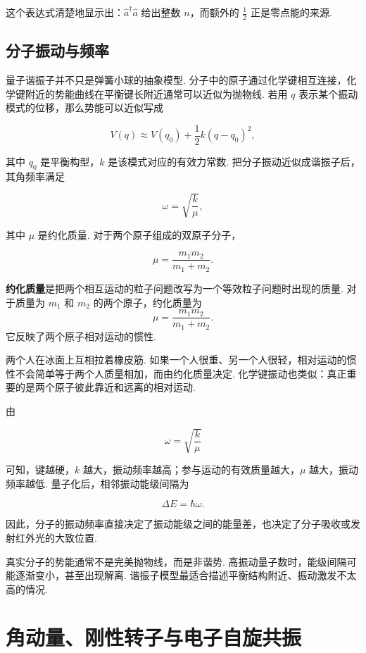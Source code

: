 \documentclass[UTF8,11pt,a4paper,openany]{ctexbook}
\newcommand{\term}[1]{\textbf{#1}}
\begin{document}
这个表达式清楚地显示出：$\hat a^\dagger\hat a$ 给出整数 $n$，而额外的 $\frac12$ 正是零点能的来源. 

\section{分子振动与频率}

量子谐振子并不只是弹簧小球的抽象模型. 分子中的原子通过化学键相互连接，化学键附近的势能曲线在平衡键长附近通常可以近似为抛物线. 若用 $q$ 表示某个振动模式的位移，那么势能可以近似写成

\[
V(q)\approx V(q_0)+\frac12 k(q-q_0)^2,
\]

其中 $q_0$ 是平衡构型，$k$ 是该模式对应的有效力常数. 把分子振动近似成谐振子后，其角频率满足

\[
\omega=\sqrt{\frac{k}{\mu}},
\]

其中 $\mu$ 是约化质量. 对于两个原子组成的双原子分子，

\[
\mu=\frac{m_1m_2}{m_1+m_2}.
\]

\begin{definitionbox}
\term{约化质量}是把两个相互运动的粒子问题改写为一个等效粒子问题时出现的质量. 对于质量为 $m_1$ 和 $m_2$ 的两个原子，约化质量为
\[
\mu=\frac{m_1m_2}{m_1+m_2}.
\]
它反映了两个原子相对运动的惯性. 
\end{definitionbox}

\begin{analogybox}
两个人在冰面上互相拉着橡皮筋. 如果一个人很重、另一个人很轻，相对运动的惯性不会简单等于两个人质量相加，而由约化质量决定. 化学键振动也类似：真正重要的是两个原子彼此靠近和远离的相对运动. 
\end{analogybox}

由

\[
\omega=\sqrt{\frac{k}{\mu}}
\]

可知，键越硬，$k$ 越大，振动频率越高；参与运动的有效质量越大，$\mu$ 越大，振动频率越低. 量子化后，相邻振动能级间隔为

\[
\Delta E=\hbar\omega.
\]

因此，分子的振动频率直接决定了振动能级之间的能量差，也决定了分子吸收或发射红外光的大致位置. 

\begin{limitbox}
真实分子的势能通常不是完美抛物线，而是非谐势. 高振动量子数时，能级间隔可能逐渐变小，甚至出现解离. 谐振子模型最适合描述平衡结构附近、振动激发不太高的情况. 
\end{limitbox}

\chapter{角动量、刚性转子与电子自旋共振}
\end{document}
